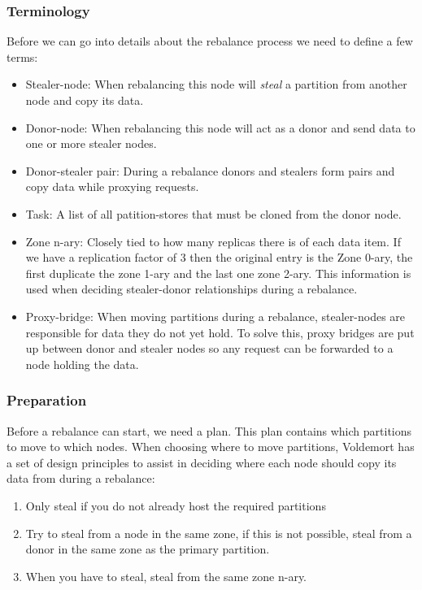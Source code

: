 \subsubsection{Terminology}
Before we can go into details about the rebalance process we need to define a few terms:

\begin{itemize}
\item Stealer-node: When rebalancing this node will \emph{steal} a partition from another node and copy its data.  
\item Donor-node: When rebalancing this node will act as a donor and send data to one or more stealer nodes.
\item Donor-stealer pair: During a rebalance donors and stealers form pairs and copy data while proxying requests.
\item Task: A list of all patition-stores that must be cloned from the donor node.  
\item Zone n-ary: Closely tied to how many replicas there is of each data item. If we have a replication factor of 3 then the original entry is the Zone 0-ary, the first duplicate the zone 1-ary and the last one zone 2-ary. This information is used when deciding stealer-donor relationships during a rebalance. 
\item Proxy-bridge: When moving partitions during a rebalance, stealer-nodes are responsible for data they do not yet hold. To solve this, proxy bridges are put up between donor and stealer nodes so any request can be forwarded to a node holding the data.
\end{itemize}

\subsubsection{Preparation}
Before a rebalance can start, we need a plan. This plan contains which partitions to move to which nodes. When choosing where to move partitions, Voldemort has a set of design principles to assist in deciding where each node should copy its data from during a rebalance:

\begin{enumerate}
\item Only steal if you do not already host the required partitions
\item Try to steal from a node in the same zone, if this is not possible, steal from a donor in the same zone as the primary partition.
\item When you have to steal, steal from the same zone n-ary. 
\end{enumerate}

